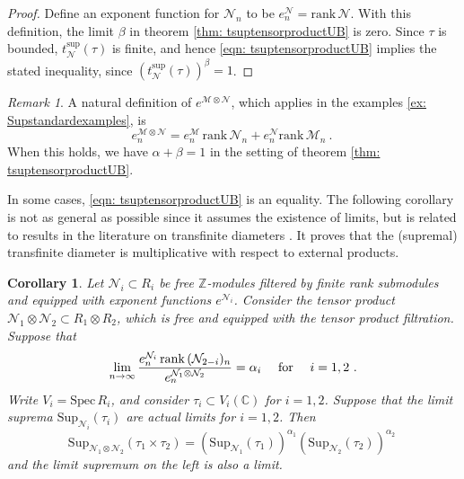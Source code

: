 \documentclass[a4paper,10pt]{amsart}
\newtheorem{cor}[thm]{Corollary}
\theoremstyle{definition}
\theoremstyle{remark}
\newtheorem{rem}[thm]{Remark}
\numberwithin{equation}{section}
\newcommand{\Z}{\mathbb Z}
\newcommand{\C}{\mathbb C}
\newcommand{\ts}{\mathrm{Sup}}
\newcommand{\rank}{\mathrm{rank}}
\newcommand{\0}{\color{blue}{\mathsf{0}}}
\begin{document}
  \begin{proof}  Define an exponent function for $\mathcal{N}_n$ to be $e^{\mathcal{N}}_n = \rank\,  \mathcal{N}$.  With this definition, the limit $\beta$ in theorem \ref{thm: tsuptensorproductUB} is zero. Since $\tau$ is bounded,  $t^{\sup}_{\mathcal{N}}(\tau) $ is finite, and   hence \eqref{eqn: tsuptensorproductUB} implies the stated inequality, since
  $ \left(t^{\sup}_{\mathcal{N}}(\tau) \right)^{\beta}  =1$. 
  \end{proof}
  
  \begin{rem}
  A natural definition of $e^{\mathcal{M} \otimes \mathcal{N}}$, which applies in the  examples \ref{ex: Supstandardexamples}, is 
  \begin{equation} \label{etensorcanonical}
  e^{\mathcal{M} \otimes \mathcal{N}}_n =  e_n^{\mathcal{M}} \, \rank \, \mathcal{N}_n + e_n^{\mathcal{N}}  \rank\, \mathcal{M}_n\ .  \
  \end{equation} 
  When this holds,  we have $\alpha+\beta=1$ in the setting of theorem \ref{thm: tsuptensorproductUB}. 
  \end{rem} 
  In some cases, \eqref{eqn: tsuptensorproductUB} is an equality.  
  The following corollary is not as general as possible since it assumes the existence of  limits,  but is related to results in the literature on transfinite diameters \cite{LevenbergWielonsky}. 
  It  proves that the (supremal)  transfinite diameter is multiplicative with respect to external products.
  
 
 \begin{cor} Let $\mathcal{N}_i \subset R_i$ be  free $\Z$-modules filtered by finite rank submodules and equipped with exponent functions $e^{\mathcal{N}_i}$. Consider the tensor product $\mathcal{N}_1 \otimes \mathcal{N}_2 \subset R_1 \otimes R_2$, which  is free and equipped with the tensor product filtration. 
 Suppose that
     \[   \lim_{n \rightarrow \infty}  \frac{e^{\mathcal{N}_i}_n \, \rank\, (\mathcal{N}_{2-i})_n}{ e^{\mathcal{N}_1\otimes\mathcal{N}_2}_n}  =\alpha_i 
    \quad  \hbox{ for } \quad i =1,2\  .  \]
 Write  $V_i = \mathrm{Spec} \,R_i$, and  consider $\tau_i \subset V_i(\C)$ for $i=1,2$. Suppose that  the limit suprema $\ts_{\mathcal{N}_i}(\tau_i)$  are actual limits for $i=1,2$.   Then 
  \[  \ts_{\mathcal{N}_1 \otimes \mathcal{N}_2} (\tau_1 \times \tau_2)  = \left(\ts_{\mathcal{N}_1}(\tau_1)\right)^{\alpha_1}    \left(\ts_{\mathcal{N}_2}(\tau_2) \right)^{\alpha_2} \  
\] 
and the limit supremum on the left is also a limit.
 \end{cor}
 
\end{document}
